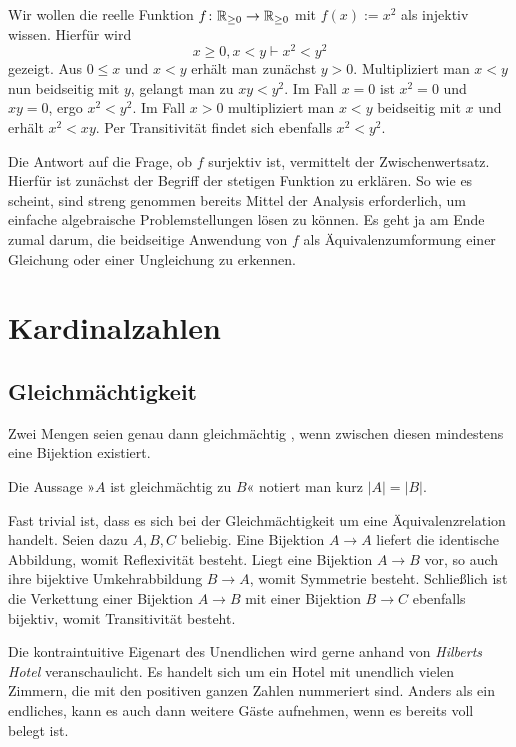 \noindent
{} Wir wollen die reelle Funktion $f\colon\mathbb R_{\ge 0}\to\mathbb R_{\ge 0}$
mit $f(x):=x^2$ als injektiv wissen. Hierfür wird
\[x\ge 0,x<y\vdash x^2<y^2\]
gezeigt. Aus $0\le x$ und $x<y$ erhält man zunächst $y>0$. Multipliziert man
$x<y$ nun beidseitig mit $y$, gelangt man zu $xy<y^2$. Im Fall $x=0$ ist
$x^2=0$ und $xy=0$, ergo $x^2<y^2$. Im Fall $x>0$ multipliziert man
$x<y$ beidseitig mit $x$ und erhält $x^2<xy$. Per Transitivität
findet sich ebenfalls $x^2<y^2$.

Die Antwort auf die Frage, ob $f$ surjektiv ist, vermittelt der
Zwischenwertsatz. Hierfür ist zunächst der Begriff der stetigen
Funktion zu erklären. So wie es scheint, sind streng genommen bereits
Mittel der Analysis erforderlich, um einfache algebraische
Problemstellungen lösen zu können. Es geht ja am Ende zumal darum, die
beidseitige Anwendung von $f$ als Äquivalenzumformung einer
Gleichung oder einer Ungleichung zu erkennen.

\newpage
\section{Kardinalzahlen}

\subsection{Gleichmächtigkeit}

\begin{Definition}[Gleichmächtigkeit]\newlinefirst
Zwei Mengen seien genau dann gleichmächtig%
, wenn zwischen diesen
mindestens eine Bijektion existiert.
\end{Definition}
Die Aussage »$A$ ist gleichmächtig zu $B$« notiert man kurz $|A|=|B|$.

Fast trivial ist, dass es sich bei der Gleichmächtigkeit um eine
Äquivalenzrelation handelt. Seien dazu $A,B,C$ beliebig. Eine Bijektion
$A\to A$ liefert die identische Abbildung, womit Reflexivität besteht.
Liegt eine Bijektion $A\to B$ vor, so auch ihre bijektive Umkehrabbildung
$B\to A$, womit Symmetrie besteht. Schließlich ist die Verkettung einer
Bijektion $A\to B$ mit einer Bijektion $B\to C$ ebenfalls bijektiv, womit
Transitivität besteht.

Die kontraintuitive Eigenart des Unendlichen wird gerne anhand von
\emph{Hilberts Hotel} veranschaulicht. Es handelt
sich um ein Hotel mit unendlich vielen Zimmern, die mit den positiven
ganzen Zahlen nummeriert sind. Anders als ein endliches, kann es auch
dann weitere Gäste aufnehmen, wenn es bereits voll belegt ist.

